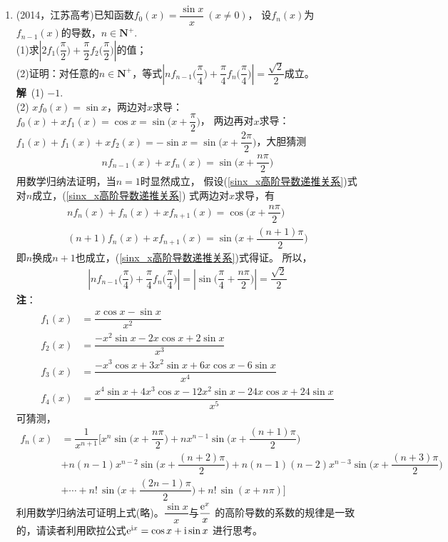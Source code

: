 \begin{enumerate}[label={【\textbf{例\thechapter.\arabic*}】},
 leftmargin=\inteval{\myenumleftmargin}pt,
 itemsep=\inteval{\myenumitempsep}pt,
 itemindent=\inteval{\myenumitemindent}pt]
\item (2014，江苏高考)已知函数$f_{0}(x)=\dfrac{\sin x}{x}\ (x\neq 0)$，
设$f_{n}(x)$为$f_{n-1}(x)$的导数，$n\in \textbf{N}^{+}$. \\
(1)求$ \left|2f_{1}\Big(\dfrac{\pi}{2}\Big)+
\dfrac{\pi}{2}f_{2}\Big(\dfrac{\pi}{2}\Big)\right| $的值；\\
(2)证明：对任意的$n\in \textbf{N}^{+}$，等式$\left|nf_{n-1}
\Big(\dfrac{\pi}{4}\Big)+\dfrac{\pi}{4}f_{n}
\Big(\dfrac{\pi}{4}\Big)\right|=\dfrac{\sqrt{2}}{2}$成立。\\
\textbf{解}\ (1) $ -1 $. \\
(2) $ xf_0(x)=\sin x $，两边对$ x $求导：$ f_0(x)+xf_1(x)=\cos x=
\sin\Big(x+\dfrac{\pi}{2}\Big) $，
两边再对$ x $求导：$ f_1(x)+f_1(x)+xf_2(x)=-\sin x=
\sin\Big(x+\dfrac{2\pi}{2}\Big) $，大胆猜测
\begin{gather}\label{sinx_x高阶导数递推关系}
    nf_{n-1}(x)+xf_{n}(x)=\sin\Big(x+\dfrac{n\pi}{2}\Big)
\end{gather}
用数学归纳法证明，当$ n=1 $时显然成立，
假设(\ref{sinx_x高阶导数递推关系})式对$ n $成立，(\ref{sinx_x高阶导数递推关系})
式两边对$ x $求导，有
\begin{gather*}
    nf_{n}(x)+f_n(x)+xf_{n+1}(x)=\cos\Big(x+\dfrac{n\pi}{2}\Big) \\
    (n+1)f_n(x)+xf_{n+1}(x)=\sin\Big(x+\dfrac{(n+1)\pi}{2}\Big)
\end{gather*}
即$ n $换成$ n+1 $也成立，(\ref{sinx_x高阶导数递推关系})式得证。
所以，
\begin{gather*}
    \left|nf_{n-1}\Big(\dfrac{\pi}{4}\Big)+\dfrac{\pi}{4}f_{n}
    \Big(\dfrac{\pi}{4}\Big)\right|=\left|\sin\Big(\dfrac{\pi}{4}
    +\dfrac{n\pi}{2}\Big)\right|=\dfrac{\sqrt{2}}{2}
\end{gather*}
\textbf{注}：
\begin{align*}
    f_1(x) &=\dfrac{x\cos x-\sin x}{x^2}  \\
    f_2(x) &=\dfrac{-x^{2}\sin x-2x\cos x+2\sin x}{x^3}  \\
    f_3(x) &=\dfrac{-x^{3}\cos x+3x^{2}\sin x+6x\cos x-6\sin x}{x^4}  \\
    f_4(x) &=\dfrac{x^{4}\sin x+4x^{3}\cos x-12x^{2}\sin x-24x\cos x+
        24\sin x}{x^5}
\end{align*}
可猜测，
\begin{align*}
    f_n(x) &=\dfrac{1}{x^{n+1}}\Bigg[x^{n}\sin \Big(x+\dfrac{n\pi}{2}\Big)+
    nx^{n-1}\sin \Big(x+\dfrac{(n+1)\pi}{2}\Big)  \\
    & + n(n-1)x^{n-2}\sin \Big(x+\dfrac{(n+2)\pi}{2}\Big)
    +n(n-1)(n-2)x^{n-3}\sin \Big(x+\dfrac{(n+3)\pi}{2}\Big)  \\
    & +\cdots +n!\,\sin\Big(x+\dfrac{(2n-1)\pi}{2}\Big)+
    n!\,\sin(x+n\pi)\Bigg]
\end{align*}
利用数学归纳法可证明上式(略)。$ \dfrac{\sin x}{x} $与$ \dfrac{\mathrm{e}^x}{x} $
的高阶导数的系数的规律是一致的，请读者利用欧拉公式$ \mathrm{e}^{\mathrm{i} x}=\cos x+\mathrm{i}\sin x $
进行思考。


\end{enumerate}
